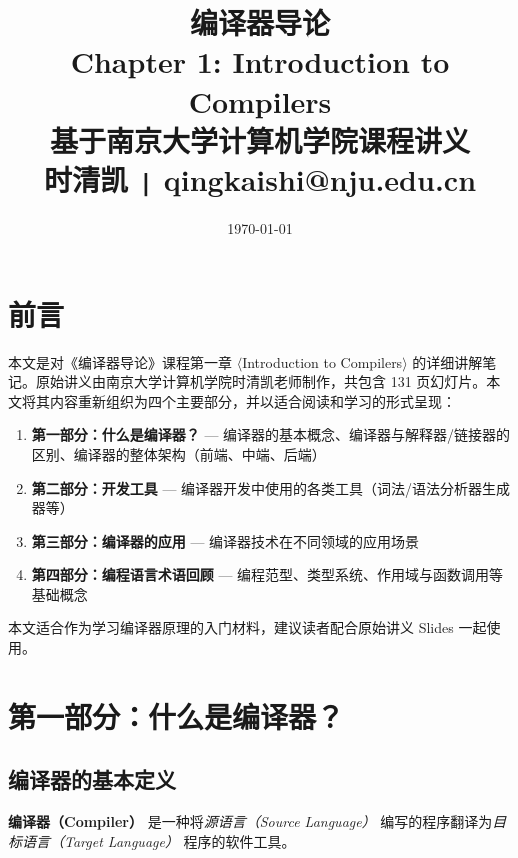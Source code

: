 \documentclass[12pt,a4paper]{ctexart}
\title{
  \vspace{2cm}
  {\Huge\bfseries\color{mainblue} 编译器导论}\\[0.5cm]
  {\Large\color{subblue} Chapter 1: Introduction to Compilers}\\[1cm]
  {\normalsize\color{gray} 基于南京大学计算机学院课程讲义}\\[0.3cm]
  {\normalsize\color{gray} 时清凯 \texttt{|} qingkaishi@nju.edu.cn}
  \vspace{1cm}
}
\author{}
\date{\today}
\newcommand{\term}[1]{\textbf{\textcolor{mainblue}{#1}}}
\begin{document}
\maketitle
\thispagestyle{empty}

\newpage
\setcounter{page}{1}
\tableofcontents
\newpage

\section*{前言}

本文是对《编译器导论》课程第一章 $\langle$Introduction to Compilers$\rangle$ 的详细讲解笔记。原始讲义由南京大学计算机学院时清凯老师制作，共包含 131 页幻灯片。本文将其内容重新组织为四个主要部分，并以适合阅读和学习的形式呈现：

\begin{enumerate}[leftmargin=2em, itemsep=0.3em]
  \item \textbf{第一部分：什么是编译器？} — 编译器的基本概念、编译器与解释器/链接器的区别、编译器的整体架构（前端、中端、后端）
  \item \textbf{第二部分：开发工具} — 编译器开发中使用的各类工具（词法/语法分析器生成器等）
  \item \textbf{第三部分：编译器的应用} — 编译器技术在不同领域的应用场景
  \item \textbf{第四部分：编程语言术语回顾} — 编程范型、类型系统、作用域与函数调用等基础概念
\end{enumerate}

\vspace{0.5cm}
本文适合作为学习编译器原理的入门材料，建议读者配合原始讲义 Slides 一起使用。

\newpage

\section{第一部分：什么是编译器？}

\subsection{编译器的基本定义}

\begin{keybox}
  \term{编译器（Compiler）} 是一种将\emph{源语言（Source Language）} 编写的程序翻译为\emph{目标语言（Target Language）} 程序的软件工具。
\end{keybox}
\end{document}
